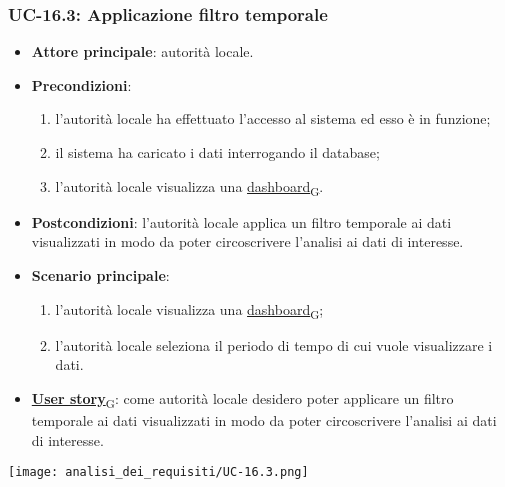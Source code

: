 \subsubsection{UC-16.3: Applicazione filtro temporale}
\begin{itemize}
	\item \textbf{Attore principale}: autorità locale.
	\item \textbf{Precondizioni}:
	      \begin{enumerate}
		      \item l'autorità locale ha effettuato l'accesso al sistema ed esso è in funzione;
		      \item il sistema ha caricato i dati interrogando il database;
		      \item l'autorità locale visualizza una \href{https://7last.github.io/docs/pb/documentazione-interna/glossario\#dashboard}{dashboard\textsubscript{G}}.
	      \end{enumerate}
	\item \textbf{Postcondizioni}: l'autorità locale applica un filtro temporale ai dati visualizzati in modo da poter circoscrivere l'analisi ai dati di interesse.
	\item \textbf{Scenario principale}:
	      \begin{enumerate}
		      \item l'autorità locale visualizza una \href{https://7last.github.io/docs/pb/documentazione-interna/glossario\#dashboard}{dashboard\textsubscript{G}};
		      \item l'autorità locale seleziona il periodo di tempo di cui vuole visualizzare i dati.
	      \end{enumerate}
	\item \href{https://7last.github.io/docs/pb/documentazione-interna/glossario\#user-story}{\textbf{User story}\textsubscript{G}}:
	      come autorità locale desidero poter applicare un filtro temporale ai dati visualizzati in modo da poter circoscrivere l'analisi ai dati di interesse.
\end{itemize}
\begin{center}
	\texttt{[image: analisi\_dei\_requisiti/UC-16.3.png]}
\end{center}

